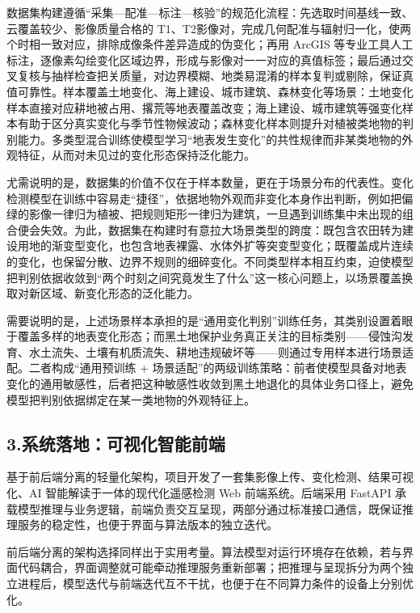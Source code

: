 数据集构建遵循“采集—配准—标注—核验”的规范化流程：先选取时间基线一致、云覆盖较少、影像质量合格的 T1、T2影像对，完成几何配准与辐射归一化，使两个时相一致对应，排除成像条件差异造成的伪变化；再用 ArcGIS 等专业工具人工标注，逐像素勾绘变化区域边界，形成与影像对一一对应的真值标签；最后通过交叉复核与抽样检查把关质量，对边界模糊、地类易混淆的样本复判或剔除，保证真值可靠性。样本覆盖土地变化、海上建设、城市建筑、森林变化等场景：土地变化样本直接对应耕地被占用、撂荒等地表覆盖改变；海上建设、城市建筑等强变化样本有助于区分真实变化与季节性物候波动；森林变化样本则提升对植被类地物的判别能力。多类型混合训练使模型学习“地表发生变化”的共性规律而非某类地物的外观特征，从而对未见过的变化形态保持泛化能力。

尤需说明的是，数据集的价值不仅在于样本数量，更在于场景分布的代表性。变化检测模型在训练中容易走“捷径”，依据地物外观而非变化本身作出判断，例如把偏绿的影像一律归为植被、把规则矩形一律归为建筑，一旦遇到训练集中未出现的组合便会失效。为此，数据集在构建时有意拉大场景类型的跨度：既包含农田转为建设用地的渐变型变化，也包含地表裸露、水体外扩等突变型变化；既覆盖成片连续的变化，也保留分散、边界不规则的细碎变化。不同类型样本相互约束，迫使模型把判别依据收敛到“两个时刻之间究竟发生了什么”这一核心问题上，以场景覆盖换取对新区域、新变化形态的泛化能力。

需要说明的是，上述场景样本承担的是“通用变化判别”训练任务，其类别设置着眼于覆盖多样的地表变化形态；而黑土地保护业务真正关注的目标类别——侵蚀沟发育、水土流失、土壤有机质流失、耕地违规破坏等——则通过专用样本进行场景适配。二者构成“通用预训练 + 场景适配”的两级训练策略：前者使模型具备对地表变化的通用敏感性，后者把这种敏感性收敛到黑土地退化的具体业务口径上，避免模型把判别依据绑定在某一类地物的外观特征上。

\subsection{3.系统落地：可视化智能前端}

基于前后端分离的轻量化架构，项目开发了一套集影像上传、变化检测、结果可视化、AI 智能解读于一体的现代化遥感检测 Web 前端系统。后端采用 FastAPI 承载模型推理与业务逻辑，前端负责交互呈现，两部分通过标准接口通信，既保证推理服务的稳定性，也便于界面与算法版本的独立迭代。

前后端分离的架构选择同样出于实用考量。算法模型对运行环境存在依赖，若与界面代码耦合，界面调整就可能牵动推理服务重新部署；把推理与呈现拆分为两个独立进程后，模型迭代与前端迭代互不干扰，也便于在不同算力条件的设备上分别优化。

